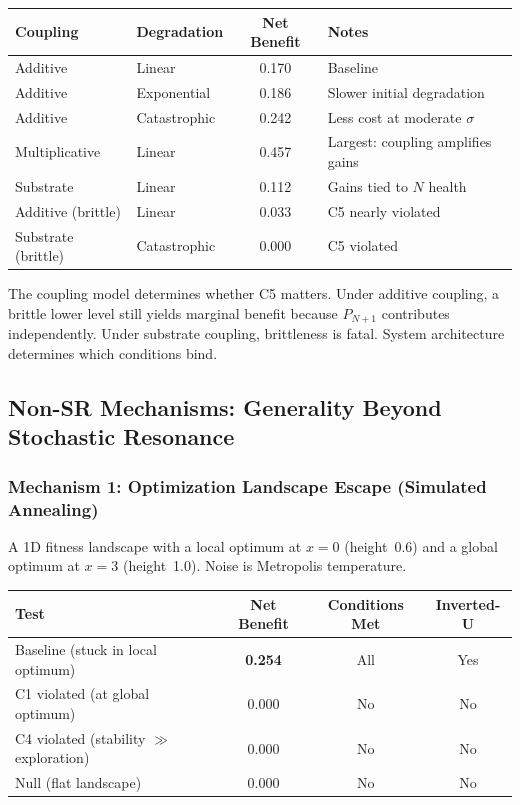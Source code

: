 \documentclass[12pt,letterpaper]{article}
\theoremstyle{definition}
\theoremstyle{remark}
\newcommand{\Pnp}{P_{N+1}}
\begin{document}
\begin{center}
\begin{tabular}{@{}llcl@{}}
\toprule
\textbf{Coupling} & \textbf{Degradation} & \textbf{Net Benefit} & \textbf{Notes} \\
\midrule
Additive & Linear & 0.170 & Baseline \\
Additive & Exponential & 0.186 & Slower initial degradation \\
Additive & Catastrophic & 0.242 & Less cost at moderate $\sigma$ \\
Multiplicative & Linear & 0.457 & Largest: coupling amplifies gains \\
Substrate & Linear & 0.112 & Gains tied to $N$ health \\
Additive (brittle) & Linear & 0.033 & C5 nearly violated \\
Substrate (brittle) & Catastrophic & 0.000 & C5 violated \\
\bottomrule
\end{tabular}
\end{center}

The coupling model determines whether C5 matters. Under additive coupling, a brittle lower level still yields marginal benefit because $\Pnp$ contributes independently. Under substrate coupling, brittleness is fatal. System architecture determines which conditions bind.


\subsection{Non-SR Mechanisms: Generality Beyond Stochastic Resonance}

\subsubsection{Mechanism 1: Optimization Landscape Escape (Simulated Annealing)}

A 1D fitness landscape with a local optimum at $x = 0$ (height~0.6) and a global optimum at $x = 3$ (height~1.0). Noise is Metropolis temperature.

\begin{center}
\begin{tabular}{@{}lccc@{}}
\toprule
\textbf{Test} & \textbf{Net Benefit} & \textbf{Conditions Met} & \textbf{Inverted-U} \\
\midrule
Baseline (stuck in local optimum) & \textbf{0.254} & All & Yes \\
C1 violated (at global optimum) & 0.000 & No & No \\
C4 violated (stability $\gg$ exploration) & 0.000 & No & No \\
Null (flat landscape) & 0.000 & No & No \\
\bottomrule
\end{tabular}
\end{center}
\end{document}
